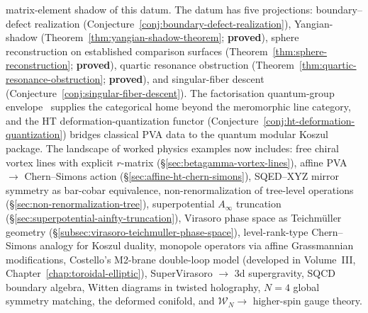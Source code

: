 \begin{enumerate}
 matrix-element shadow of this datum. The datum has five
 projections: boundary--defect realization
 (Conjecture~\ref{conj:boundary-defect-realization}),
 Yangian-shadow
 (Theorem~\ref{thm:yangian-shadow-theorem}; \textbf{proved}),
 sphere reconstruction on established comparison surfaces
 (Theorem~\ref{thm:sphere-reconstruction}; \textbf{proved}),
 quartic resonance obstruction
 (Theorem~\ref{thm:quartic-resonance-obstruction}; \textbf{proved}),
 and singular-fiber descent
 (Conjecture~\ref{conj:singular-fiber-descent}).
 The factorisation quantum-group envelope~\cite{Latyntsev23}
 supplies the categorical home beyond the meromorphic line category,
 and the HT deformation-quantization functor
 (Conjecture~\ref{conj:ht-deformation-quantization})
 bridges classical PVA data to the quantum modular Koszul package.
 The landscape of worked physics examples now includes:
 free chiral vortex lines with explicit $r$-matrix
 (\S\ref{sec:betagamma-vortex-lines}),
 affine PVA $\to$ Chern--Simons action
 (\S\ref{sec:affine-ht-chern-simons}),
 SQED--XYZ mirror symmetry as bar-cobar equivalence,
 non-renormalization of tree-level operations
 (\S\ref{sec:non-renormalization-tree}),
 superpotential $A_\infty$ truncation
 (\S\ref{sec:superpotential-ainfty-truncation}),
 Virasoro phase space as Teichm\"uller geometry
 (\S\ref{subsec:virasoro-teichmuller-phase-space}),
 level-rank-type Chern--Simons analogy for Koszul duality,
 monopole operators via affine Grassmannian modifications,
 Costello's M2-brane double-loop model
 (developed in Volume~III, Chapter~\ref{chap:toroidal-elliptic}),
 SuperVirasoro $\to$ 3d supergravity,
 SQCD boundary algebra,
 Witten diagrams in twisted holography,
 $N=4$ global symmetry matching,
 the deformed conifold,
 and $\mathcal{W}_N \to$ higher-spin gauge theory.
\end{enumerate}

